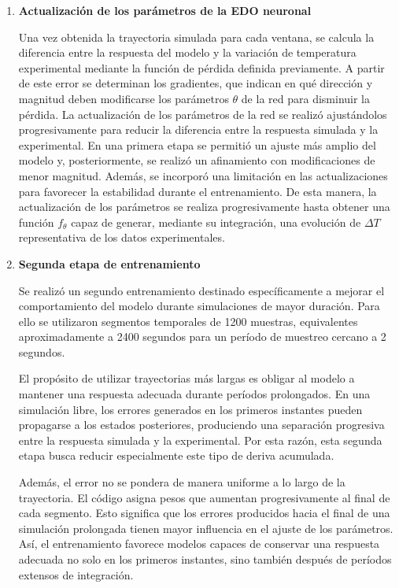 \documentclass[11pt]{report}
\begin{document}
\begin{enumerate}
\item \textbf{Actualización de los parámetros de la EDO neuronal}

Una vez obtenida la trayectoria simulada para cada ventana, se calcula la diferencia entre la respuesta del modelo y la variación de temperatura experimental mediante la función de pérdida definida previamente. A partir de este error se determinan los gradientes, que indican en qué dirección y magnitud deben modificarse los parámetros $\theta$ de la red para disminuir la pérdida. La actualización de los parámetros de la red se realizó ajustándolos progresivamente para reducir la diferencia entre la respuesta simulada y la experimental. En una primera etapa se permitió un ajuste más amplio del modelo y, posteriormente, se realizó un afinamiento con modificaciones de menor magnitud. Además, se incorporó una limitación en las actualizaciones para favorecer la estabilidad durante el entrenamiento. De esta manera, la actualización de los parámetros se realiza progresivamente hasta obtener una función $f_\theta$ capaz de generar, mediante su integración, una evolución de $\Delta T $representativa de los datos experimentales.


\item \textbf{Segunda etapa de entrenamiento}

Se realizó un segundo entrenamiento destinado específicamente a mejorar el comportamiento del modelo durante simulaciones de mayor duración. Para ello se utilizaron segmentos temporales de 1200 muestras, equivalentes aproximadamente a 2400 segundos para un período de muestreo cercano a 2 segundos. 

El propósito de utilizar trayectorias más largas es obligar al modelo a mantener una respuesta adecuada durante períodos prolongados. En una simulación libre, los errores generados en los primeros instantes pueden propagarse a los estados posteriores, produciendo una separación progresiva entre la respuesta simulada y la experimental. Por esta razón, esta segunda etapa busca reducir especialmente este tipo de deriva acumulada.

Además, el error no se pondera de manera uniforme a lo largo de la trayectoria. El código asigna pesos que aumentan progresivamente al final de cada segmento. Esto significa que los errores producidos hacia el final de una simulación prolongada tienen mayor influencia en el ajuste de los parámetros. Así, el entrenamiento favorece modelos capaces de conservar una respuesta adecuada no solo en los primeros instantes, sino también después de períodos extensos de integración.


\end{enumerate}
\end{document}
